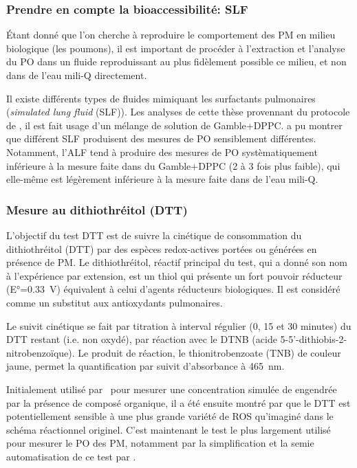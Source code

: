 \subsubsection{Prendre en compte la bioaccessibilité: SLF}%
\label{sub:prendre_en_compte_la_bioaccessibilite_slf}

Étant donné que l'on cherche à reproduire le comportement des PM en milieu biologique
(les poumons), il est important de procéder à l'extraction et l'analyse du PO dans un
fluide reproduissant au plus fidèlement possible ce milieu, et non dans de l'eau mili-Q
directement.

Il existe différents types de fluides mimiquant les surfactants pulmonaires (\textit{simulated
lung fluid} (SLF)). Les analyses de cette thèse provennant du protocole de
\textcite{calasPollution2017}, il est fait usage d'un mélange de solution de Gamble+DPPC.
\textcite{calasImportance2017} a pu montrer que différent SLF produisent des mesures de PO
sensiblement différentes. Notamment, l'ALF tend à produire des mesures de PO
systèmatiquement inférieure à la mesure faite dans du Gamble+DPPC (2 à 3 fois plus
faible), qui elle-même est légèrement inférieure à la mesure faite dans de l'eau mili-Q.

\subsubsection{Mesure au dithiothréitol (DTT)}%
\label{ssub:mesure_au_dtt}

L’objectif du test DTT est de suivre la cinétique de consommation du dithiothréitol (DTT)
par des espèces redox-actives portées ou générées en présence de PM. Le dithiothréitol,
réactif principal du test, qui a donné son nom à l’expérience par extension, est un thiol
qui présente un fort pouvoir réducteur (E°=\SI{0.33}{\V}) équivalent à celui d’agents réducteurs
biologiques. Il est considéré comme un substitut aux antioxydants pulmonaires.

Le suivit cinétique se fait par titration à interval régulier (0, 15 et 30 minutes) du DTT
restant (i.e. non oxydé), par réaction avec le DTNB (acide
5-5'-dithiobis-2-nitrobenzoïque). Le produit de réaction, le thionitrobenzoate (TNB) de
couleur jaune, permet la quantification par suivit d'absorbance à \SI{465}{nm}.

Initialement utilisé par~\textcite{choRedox2005} pour mesurer une concentration simulée de
 engendrée par la présence de composé organique, il a été ensuite montré par
\textcite{beiReaction2014} que le DTT est potentiellement sensible à une plus grande
variété de ROS qu'imaginé dans le schéma réactionnel originel. C'est maintenant le test le
plus largement utilisé pour mesurer le PO des PM, notamment par la simplification et
la semie automatisation de ce test par \textcite{fangSemiautomated2015}.

